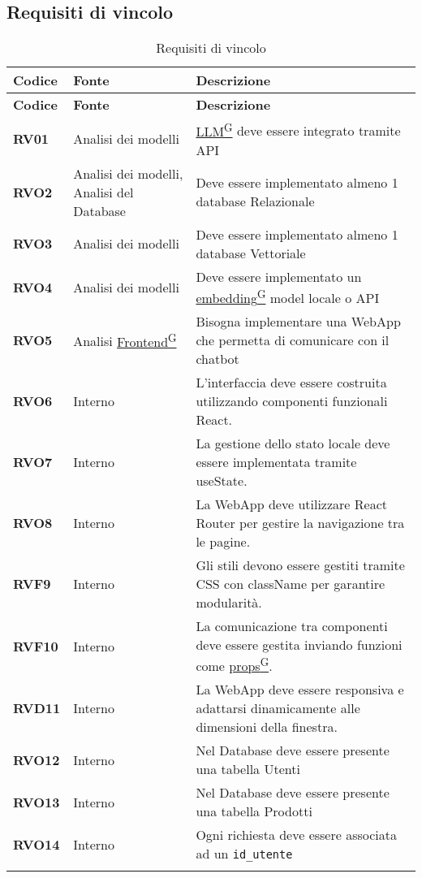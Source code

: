 \subsection{Requisiti di vincolo}
\begin{longtable}{|>{\centering\arraybackslash}m{}|>{\centering\arraybackslash}m{}|>{\centering\arraybackslash}m{}|}
	\hline
	\textbf{Codice} & \textbf{Fonte} & \textbf{Descrizione}\\\hline
	\endfirsthead
	\hline
	\textbf{Codice} & \textbf{Fonte} & \textbf{Descrizione}\\\hline
	\endhead
	\hline
	\textbf{RV01} & Analisi dei modelli    & \href{https://code7crusaders.github.io/docs/RTB/documentazione_interna/glossario.html#llm-large-language-model}{LLM\textsuperscript{G}} deve essere integrato tramite API\\
	\hline
	\textbf{RVO2} & Analisi dei modelli, Analisi del Database & Deve essere implementato almeno 1 database Relazionale\\
	\hline
	\textbf{RVO3} & Analisi dei modelli & Deve essere implementato almeno 1 database Vettoriale\\
	\hline
	\textbf{RVO4} & Analisi dei modelli & Deve essere implementato un \href{https://code7crusaders.github.io/docs/RTB/documentazione_interna/glossario.html#embedding}{embedding\textsuperscript{G}} model locale o API\\
	\hline
	\textbf{RVO5} & Analisi \href{https://code7crusaders.github.io/docs/RTB/documentazione_interna/glossario.html#frontend}{Frontend\textsuperscript{G}} & Bisogna implementare una WebApp che permetta di comunicare con il chatbot\\
	\hline
	\textbf{RVO6} & Interno & L’interfaccia deve essere costruita utilizzando componenti funzionali React.\\
	\hline
	\textbf{RVO7} & Interno & La gestione dello stato locale deve essere implementata tramite useState.\\
	\hline
	\textbf{RVO8} & Interno & La WebApp deve utilizzare React Router per gestire la navigazione tra le pagine.\\
	\hline
	\textbf{RVF9} & Interno & Gli stili devono essere gestiti tramite CSS con className per garantire modularità.\\
	\hline
	\textbf{RVF10} & Interno & La comunicazione tra componenti deve essere gestita inviando funzioni come \href{https://code7crusaders.github.io/docs/RTB/documentazione_interna/glossario.html#props}{props\textsuperscript{G}}.\\
	\hline
	\textbf{RVD11} & Interno & La WebApp deve essere responsiva e adattarsi dinamicamente alle dimensioni della finestra.\\
	\hline
	\textbf{RVO12} & Interno & Nel Database deve essere presente una tabella Utenti \\
	\hline
	\textbf{RVO13} & Interno & Nel Database deve essere presente una tabella Prodotti\\
	\hline
	\textbf{RVO14} & Interno &  Ogni richiesta deve essere associata ad un \texttt{id\_utente}\\
	\hline
	\caption{Requisiti di vincolo}
\end{longtable}

